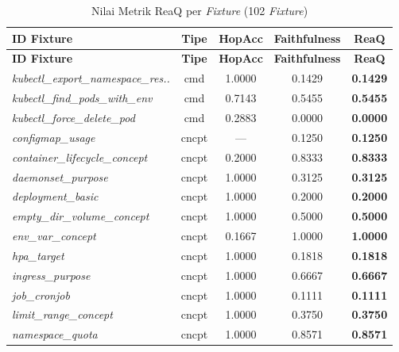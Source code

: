 \begin{footnotesize}
\begin{longtable}{|p{3.6cm}|c|c|c|c|}
\caption{Nilai Metrik ReaQ per \textit{Fixture} (102 \textit{Fixture})}
\label{tbl:reaq-full} \\
\hline
\textbf{ID Fixture} & \textbf{Tipe} & \textbf{HopAcc} & \textbf{Faithfulness} & \textbf{ReaQ} \\
\hline
\endfirsthead
\hline
\textbf{ID Fixture} & \textbf{Tipe} & \textbf{HopAcc} & \textbf{Faithfulness} & \textbf{ReaQ} \\
\hline
\endhead
\hline
\endfoot
\hline
\endlastfoot
\textit{kubectl\_\allowbreak{}export\_\allowbreak{}namespace\_\allowbreak{}res..} & cmd & 1.0000 & 0.1429 & \textbf{0.1429} \\
\hline
\textit{kubectl\_\allowbreak{}find\_\allowbreak{}pods\_\allowbreak{}with\_\allowbreak{}env} & cmd & 0.7143 & 0.5455 & \textbf{0.5455} \\
\hline
\textit{kubectl\_\allowbreak{}force\_\allowbreak{}delete\_\allowbreak{}pod} & cmd & 0.2883 & 0.0000 & \textbf{0.0000} \\
\hline
\textit{configmap\_\allowbreak{}usage} & cncpt & --- & 0.1250 & \textbf{0.1250} \\
\hline
\textit{container\_\allowbreak{}lifecycle\_\allowbreak{}concept} & cncpt & 0.2000 & 0.8333 & \textbf{0.8333} \\
\hline
\textit{daemonset\_\allowbreak{}purpose} & cncpt & 1.0000 & 0.3125 & \textbf{0.3125} \\
\hline
\textit{deployment\_\allowbreak{}basic} & cncpt & 1.0000 & 0.2000 & \textbf{0.2000} \\
\hline
\textit{empty\_\allowbreak{}dir\_\allowbreak{}volume\_\allowbreak{}concept} & cncpt & 1.0000 & 0.5000 & \textbf{0.5000} \\
\hline
\textit{env\_\allowbreak{}var\_\allowbreak{}concept} & cncpt & 0.1667 & 1.0000 & \textbf{1.0000} \\
\hline
\textit{hpa\_\allowbreak{}target} & cncpt & 1.0000 & 0.1818 & \textbf{0.1818} \\
\hline
\textit{ingress\_\allowbreak{}purpose} & cncpt & 1.0000 & 0.6667 & \textbf{0.6667} \\
\hline
\textit{job\_\allowbreak{}cronjob} & cncpt & 1.0000 & 0.1111 & \textbf{0.1111} \\
\hline
\textit{limit\_\allowbreak{}range\_\allowbreak{}concept} & cncpt & 1.0000 & 0.3750 & \textbf{0.3750} \\
\hline
\textit{namespace\_\allowbreak{}quota} & cncpt & 1.0000 & 0.8571 & \textbf{0.8571} \\

\end{longtable}
\end{footnotesize}
